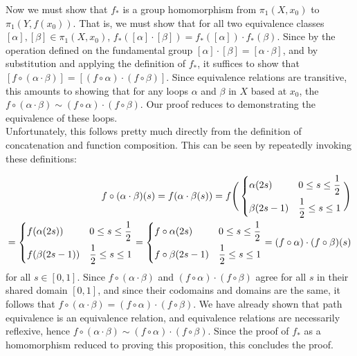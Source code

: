 \documentclass{article}
\begin{document}
Now we must show that $f_*$ is a group homomorphism from $\pi_1(X,x_0)$ to $\pi_1(Y,f(x_0)).$ That is, we must show that for all two equivalence classes $[\alpha],[\beta]\in \pi_1(X,x_0) $, $f_*([\alpha]\cdot[\beta]) = f_*([\alpha])\cdot f_*(\beta)$. Since by the operation defined on the fundamental group $[\alpha]\cdot[\beta] = [\alpha\cdot\beta]$, and by substitution and applying the definition of $f_*$, it suffices to show that $[f\circ(\alpha\cdot\beta)] = [(f\circ \alpha)\cdot (f\circ \beta)].$ Since equivalence relations are transitive, this amounts to showing that for any loops $\alpha$ and $\beta$ in $X$ based at $x_0$, the $f\circ (\alpha\cdot \beta)\sim (f\circ \alpha)\cdot (f\circ \beta)$.
Our proof reduces to demonstrating the equivalence of these loops.
\\


Unfortunately, this follows pretty much directly from the definition of concatenation and function composition. This can be seen by repeatedly invoking these definitions:

\begin{align}
    f\circ(\alpha\cdot\beta)(s) = f(\alpha\cdot\beta(s)) = f\Bigg(\begin{dcases}
    \alpha(2s) & 0\le s \le \frac{1}{2}\\
    \beta(2s-1) & \frac{1}{2} \le s \le 1
    \end{dcases}
    \Bigg)\\
    = 
    \begin{dcases}
    f(\alpha(2s)) & 0\le s \le \frac{1}{2}\\
    f(\beta(2s-1)) & \frac{1}{2} \le s \le 1
    \end{dcases} = 
    \begin{dcases}
    f\circ \alpha(2s) & 0\le s \le \frac{1}{2}\\
    f\circ \beta(2s-1) & \frac{1}{2} \le s \le 1
    \end{dcases} = (f\circ\alpha)\cdot(f\circ \beta)(s)
\end{align}
for all $s\in [0,1]$. Since $f\circ(\alpha\cdot\beta)$ and $(f\circ\alpha)\cdot (f\circ\beta)$ agree for all $s$ in their shared domain $[0,1]$, and since their codomains and domains are the same, it follows that $f\circ(\alpha\cdot\beta) = (f\circ\alpha)\cdot (f\circ\beta)$. We have already shown that path equivalence is an equivalence relation, and equivalence relations are necessarily reflexive, hence $f\circ(\alpha\cdot\beta) \sim (f\circ\alpha)\cdot (f\circ\beta)$. Since the proof of $f_*$ as a homomorphism reduced to proving this proposition, this concludes the proof. \\
\end{document}

